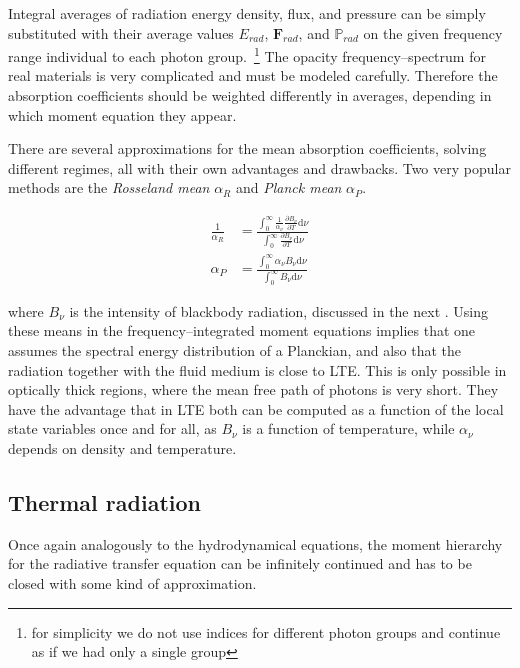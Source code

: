 Integral averages of radiation energy density, flux, and pressure can be simply substituted with their average values $E_{rad}$, $\textbf{F}_{rad}$, and $\mathbb{P}_{rad}$ on the given frequency range individual to each photon group.~\footnote{for simplicity we do not use indices for different photon groups and continue as if we had only a single group}
The opacity frequency--spectrum for real materials is very complicated and must be modeled carefully.
Therefore the absorption coefficients should be weighted differently in averages, depending in which moment equation they appear.

There are several approximations for the mean absorption coefficients, solving different regimes, all with their own advantages and drawbacks.
Two very popular methods are the \textit{Rosseland mean} $\alpha_{R}$ and \textit{Planck mean} $\alpha_{P}$.

\begin{align}
  \frac{1}{\alpha_{R}} &= \frac{\int_{0}^{\infty}\frac{1}{\alpha_{\nu}}\frac{\partial B_{\nu}}{\partial T}\mathrm{d}\nu}{\int_{0}^{\infty}\frac{\partial B_{\nu}}{\partial T}\mathrm{d}\nu} \\
  \alpha_{P} &= \frac{\int_{0}^{\infty}\alpha_{\nu}B_{\nu}\mathrm{d}\nu}{\int_{0}^{\infty}B_{\nu}\mathrm{d}\nu}
\end{align}

where $B_{\nu}$ is the intensity of blackbody radiation, discussed in the next .
Using these means in the frequency--integrated moment equations implies that one assumes the spectral energy distribution of a Planckian, and also that the radiation together with the fluid medium is close to LTE.
This is only possible in optically thick regions, where the mean free path of photons is very short.
They have the advantage that in LTE both can be computed as a function of the local state variables once and for all, as $B_{\nu}$ is a function of temperature, while $\alpha_{\nu}$ depends on density and temperature.

\subsection{Thermal radiation}
\label{subsec:LTE}

Once again analogously to the hydrodynamical equations, the moment hierarchy for the radiative transfer equation can be infinitely continued and has to be closed with some kind of approximation.

